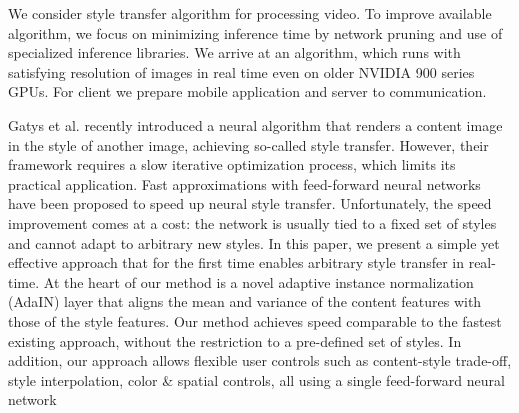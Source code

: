 \documentclass[../Main.tex]{subfiles}
\begin{document}
We consider style transfer algorithm for processing video. 
To improve available algorithm, we focus on minimizing inference time by
network pruning and use of specialized inference libraries. We arrive at an algorithm, 
which runs with satisfying resolution of images in real time even on older
NVIDIA 900 series GPUs. For client we prepare mobile application and server to communication.

Gatys et al. recently introduced a neural algorithm that
renders a content image in the style of another image,
achieving so-called style transfer. However, their framework requires a slow iterative optimization process, which
limits its practical application. Fast approximations with
feed-forward neural networks have been proposed to speed
up neural style transfer. Unfortunately, the speed improvement comes at a cost: the network is usually tied to a fixed
set of styles and cannot adapt to arbitrary new styles. In this
paper, we present a simple yet effective approach that for the
first time enables arbitrary style transfer in real-time. At the
heart of our method is a novel adaptive instance normalization (AdaIN) layer that aligns the mean and variance of the
content features with those of the style features. Our method
achieves speed comparable to the fastest existing approach,
without the restriction to a pre-defined set of styles. In addition, our approach allows flexible user controls such as
content-style trade-off, style interpolation, color & spatial
controls, all using a single feed-forward neural network

\par\vspace*{\fill} %


\biblio %
\end{document}
